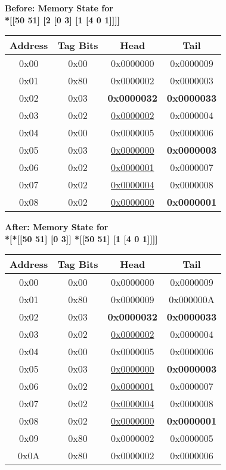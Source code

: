 \begin{figure}[htbp]
\centering

\textbf{Before: Memory State for \\ *[[50 51] [2 [0 3] [1 [4 0 1]]]]}

\vspace{0.3cm}

\begin{tabular}{|c|c|c|c|}
\hline
\textbf{Address} & \textbf{Tag Bits} & \textbf{Head} & \textbf{Tail} \\
\hline\hline
0x00 & 0x00 & 0x0000000 & 0x0000009 \\
0x01 & 0x80 & 0x0000002 & 0x0000003 \\
0x02 & 0x03 & \textbf{0x0000032} & \textbf{0x0000033} \\
0x03 & 0x02 & \underline{0x0000002} & 0x0000004 \\
0x04 & 0x00 & 0x0000005 & 0x0000006 \\
0x05 & 0x03 & \underline{0x0000000} & \textbf{0x0000003} \\
0x06 & 0x02 & \underline{0x0000001} & 0x0000007 \\
0x07 & 0x02 & \underline{0x0000004} & 0x0000008 \\
0x08 & 0x02 & \underline{0x0000000} & \textbf{0x0000001} \\
\hline
\end{tabular}

\vspace{0.5cm}

\textbf{After: Memory State for \\ *[*[[50 51] [0 3]] *[[50 51] [1 [4 0 1]]]]}

\vspace{0.3cm}

\begin{tabular}{|c|c|c|c|}
\hline
\textbf{Address} & \textbf{Tag Bits} & \textbf{Head} & \textbf{Tail} \\
\hline\hline
0x00 & 0x00 & 0x0000000 & 0x0000009 \\
\rowcolor{Gainsboro!60}
0x01 & 0x80 & 0x0000009 & 0x000000A \\
0x02 & 0x03 & \textbf{0x0000032} & \textbf{0x0000033} \\
0x03 & 0x02 & \underline{0x0000002} & 0x0000004 \\
0x04 & 0x00 & 0x0000005 & 0x0000006 \\
0x05 & 0x03 & \underline{0x0000000} & \textbf{0x0000003} \\
0x06 & 0x02 & \underline{0x0000001} & 0x0000007 \\
0x07 & 0x02 & \underline{0x0000004} & 0x0000008 \\
0x08 & 0x02 & \underline{0x0000000} & \textbf{0x0000001} \\
\rowcolor{Gainsboro!60}
0x09 & 0x80 & 0x0000002 & 0x0000005 \\
\rowcolor{Gainsboro!60}
0x0A & 0x80 & 0x0000002 & 0x0000006 \\
\hline
\end{tabular}


\end{figure}
